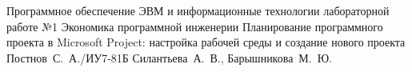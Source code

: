 \documentclass{bmstu}
\begin{document}
	
	{Программное обеспечение ЭВМ и информационные технологии}
	{лабораторной работе №1}
	{Экономика программной инженерии}
	{Планирование программного проекта в Microsoft Project: настройка рабочей среды и создание нового проекта}
	{}
	{Постнов~С.~А./ИУ7-81Б}
	{Силантьева~А.~В., Барышникова~М.~Ю.}
	
	\maketableofcontents
	
	
	
\end{document}
